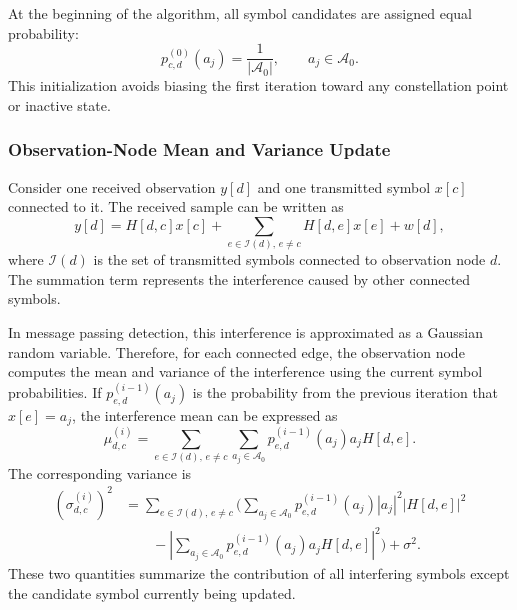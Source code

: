 At the beginning of the algorithm, all symbol candidates are assigned equal probability:
\begin{equation}
    p_{c,d}^{(0)}(a_j)
    =
    \frac{1}{|\mathcal{A}_{0}|},
    \qquad
    a_j\in\mathcal{A}_{0}.
    \label{eq:mp_uniform_initialization}
\end{equation}
This initialization avoids biasing the first iteration toward any constellation point or inactive state.

\subsubsection{Observation-Node Mean and Variance Update}

Consider one received observation \(y[d]\) and one transmitted symbol \(x[c]\) connected to it. The received sample can be written as
\begin{equation}
    y[d]
    =
    H[d,c]x[c]
    +
    \sum_{e\in\mathcal{I}(d),\,e\neq c}
    H[d,e]x[e]
    +
    w[d],
    \label{eq:mp_observation_model}
\end{equation}
where \(\mathcal{I}(d)\) is the set of transmitted symbols connected to observation node \(d\). The summation term represents the interference caused by other connected symbols.

In message passing detection, this interference is approximated as a Gaussian random variable. Therefore, for each connected edge, the observation node computes the mean and variance of the interference using the current symbol probabilities. If \(p_{e,d}^{(i-1)}(a_j)\) is the probability from the previous iteration that \(x[e]=a_j\), the interference mean can be expressed as
\begin{equation}
    \mu_{d,c}^{(i)}
    =
    \sum_{e\in\mathcal{I}(d),\,e\neq c}
    \sum_{a_j\in\mathcal{A}_{0}}
    p_{e,d}^{(i-1)}(a_j)
    a_j
    H[d,e].
\end{equation}
The corresponding variance is
\begin{equation}
    \begin{aligned}
    \left(\sigma_{d,c}^{(i)}\right)^2
    &=
    \sum_{e\in\mathcal{I}(d),\,e\neq c}
    \Bigg(
    \sum_{a_j\in\mathcal{A}_{0}}
    p_{e,d}^{(i-1)}(a_j)
    |a_j|^2
    |H[d,e]|^2
    \\
    &\qquad
    -
    \left|
    \sum_{a_j\in\mathcal{A}_{0}}
    p_{e,d}^{(i-1)}(a_j)
    a_j
    H[d,e]
    \right|^2
    \Bigg)
    +
    \sigma^2.
    \end{aligned}
\end{equation}
These two quantities summarize the contribution of all interfering symbols except the candidate symbol currently being updated.

